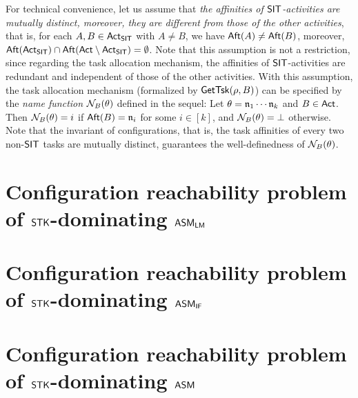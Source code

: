 For technical convenience, let us assume that \emph{the affinities of ${\sf SIT}$-activities are mutually distinct, moreover, they are different from those of the other activities}, that is, for each $A, B \in {\sf Act}_{\sf SIT}$ with $A \neq B$, we have ${\sf Aft}(A) \neq {\sf Aft}(B)$, moreover, ${\sf Aft}({\sf Act}_{\sf SIT}) \cap {\sf Aft}({\sf Act} \setminus {\sf Act}_{\sf SIT}) = \emptyset$. Note that this assumption is not a restriction, since regarding the task allocation mechanism, the affinities of ${\sf SIT}$-activities are redundant and independent of those of the other activities. With this assumption, the task allocation mechanism (formalized by $\mathsf{GetTsk}(\rho, B)$) can be specified by the \emph{name function} $\mathcal{N}_B(\theta)$ defined in the sequel:  Let $\theta = \mathfrak{n}_1 \cdots \mathfrak{n}_k$ and $B \in {\sf Act}$. Then $\mathcal{N}_B(\theta) = i$ if ${\sf Aft}(B) = \mathfrak{n}_i$ for some $i \in [k]$, and $\mathcal{N}_B(\theta) = \bot$ otherwise. Note that the invariant of configurations, that is, the task affinities of every two non-${\sf SIT}$ tasks are mutually distinct, guarantees the well-definedness of $\mathcal{N}_B(\theta)$.




\section{Configuration reachability problem of $\mathsf{STK}$-dominating $\textsf{ASM}_\textsf{LM}$}\label{sec:reach-lmamass}


\section{Configuration reachability problem of $\mathsf{STK}$-dominating $\textsf{ASM}_\textsf{IF}$}\label{sec:reach-ifamass}



\section{Configuration reachability problem of $\mathsf{STK}$-dominating $\textsf{ASM}$}\label{sec:reach-amass}
